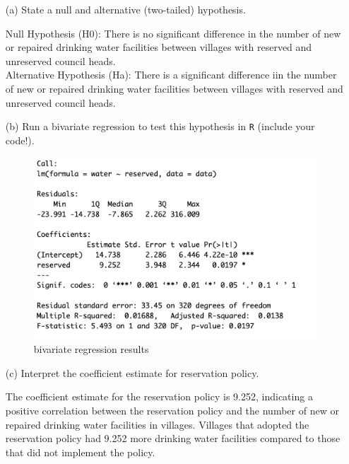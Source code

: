 \documentclass[12pt,letterpaper]{article}
\begin{document}
 \newpage
 \begin{enumerate}
 	\item [(a)] State a null and alternative (two-tailed) hypothesis. 
 	
 	Null Hypothesis (H0): There is no significant difference in the number of new or repaired drinking water facilities between villages with reserved and unreserved council heads.\\
 	
 	Alternative Hypothesis (Ha): There is a significant difference  iin the number of new or repaired drinking water facilities between villages with reserved and unreserved council heads.\\
 	
 	
 	\item [(b)] Run a bivariate regression to test this hypothesis in \texttt{R} (include your code!).
 	 
 	
 	\begin{figure}[h!]\centering
 		\caption{\footnotesize{bivariate regression results}}
 		\label{fig:9}
 		\includegraphics[width=.75\textwidth]{figure2.png}
 	\end{figure}

 	\vspace{5cm}

 	\item [(c)] Interpret the coefficient estimate for reservation policy. 
 	
 	The coefficient estimate for the reservation policy is 9.252, indicating a positive correlation between the reservation policy and the number of new or repaired drinking water facilities in villages.  Villages that adopted the reservation policy had 9.252 more drinking water facilities compared to those that did not implement the policy.\\
 	
 \end{enumerate}
 
\end{document}
